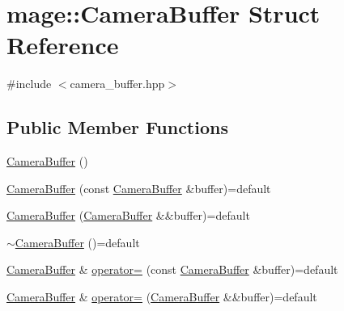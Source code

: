 \hypertarget{structmage_1_1_camera_buffer}{}\section{mage\+:\+:Camera\+Buffer Struct Reference}
\label{structmage_1_1_camera_buffer}


{\ttfamily \#include $<$camera\+\_\+buffer.\+hpp$>$}

\subsection*{Public Member Functions}
\begin{DoxyCompactItemize}
\item 
\hyperlink{structmage_1_1_camera_buffer_aca0a689a43c84fdc02e72d792b1a0ab3}{Camera\+Buffer} ()
\item 
\hyperlink{structmage_1_1_camera_buffer_a4677e0eeb321f52a6f0160c7265186a3}{Camera\+Buffer} (const \hyperlink{structmage_1_1_camera_buffer}{Camera\+Buffer} \&buffer)=default
\item 
\hyperlink{structmage_1_1_camera_buffer_a9ed685bdafbdc4b87546c082588f07c3}{Camera\+Buffer} (\hyperlink{structmage_1_1_camera_buffer}{Camera\+Buffer} \&\&buffer)=default
\item 
\hyperlink{structmage_1_1_camera_buffer_a893ff21cfa017537ccd91dd816715701}{$\sim$\+Camera\+Buffer} ()=default
\item 
\hyperlink{structmage_1_1_camera_buffer}{Camera\+Buffer} \& \hyperlink{structmage_1_1_camera_buffer_a4c2f048e1c441ae147455722d9cd4af7}{operator=} (const \hyperlink{structmage_1_1_camera_buffer}{Camera\+Buffer} \&buffer)=default
\item 
\hyperlink{structmage_1_1_camera_buffer}{Camera\+Buffer} \& \hyperlink{structmage_1_1_camera_buffer_a901081932ab76c9bdfacb0814e821190}{operator=} (\hyperlink{structmage_1_1_camera_buffer}{Camera\+Buffer} \&\&buffer)=default
\end{DoxyCompactItemize}
